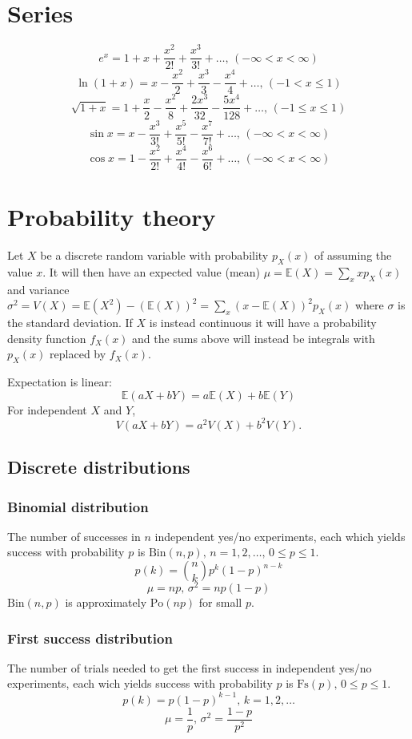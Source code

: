 \documentclass[a4paper]{article}
\begin{document}
\begin{landscape}
\begin{multicols}{2}
\section{Series} 
$$e^x = 1+x+\frac{x^2}{2!}+\frac{x^3}{3!}+\dots,\,(-\infty<x<\infty)$$
$$\ln(1+x) = x-\frac{x^2}{2}+\frac{x^3}{3}-\frac{x^4}{4}+\dots,\,(-1<x\leq1)$$
$$\sqrt{1+x} = 1+\frac{x}{2}-\frac{x^2}{8}+\frac{2x^3}{32}-\frac{5x^4}{128}+\dots,\,(-1\leq x\leq1)$$
$$\sin x = x-\frac{x^3}{3!}+\frac{x^5}{5!}-\frac{x^7}{7!}+\dots,\,(-\infty<x<\infty)$$
$$\cos x = 1-\frac{x^2}{2!}+\frac{x^4}{4!}-\frac{x^6}{6!}+\dots,\,(-\infty<x<\infty)$$

\section{Probability theory}
Let $X$ be a discrete random variable with probability $p_X(x)$ of assuming the value $x$. It will then have an expected value (mean) $\mu=\mathbb{E}(X)=\sum_xxp_X(x)$ and variance $\sigma^2=V(X)=\mathbb{E}(X^2)-(\mathbb{E}(X))^2=\sum_x(x-\mathbb{E}(X))^2p_X(x)$ where $\sigma$ is the standard deviation. If $X$ is instead continuous it will have a probability density function $f_X(x)$ and the sums above will instead be integrals with $p_X(x)$ replaced by $f_X(x)$.

Expectation is linear:
\[\mathbb{E}(aX+bY) = a\mathbb{E}(X)+b\mathbb{E}(Y)\]
For independent $X$ and $Y$, \[V(aX+bY) = a^2V(X)+b^2V(Y).\]

\subsection{Discrete distributions}

\subsubsection{Binomial distribution}
The number of successes in $n$ independent yes/no experiments, each which yields success with probability $p$ is $\textrm{Bin}(n,p),\,n=1,2,\dots,\, 0\leq p\leq1$.
\[p(k)=\binom{n}{k}p^k(1-p)^{n-k}\]
\[\mu = np,\,\sigma^2=np(1-p)\]
$\textrm{Bin}(n,p)$ is approximately $\textrm{Po}(np)$ for small $p$.

\subsubsection{First success distribution}
The number of trials needed to get the first success in independent yes/no experiments, each wich yields success with probability $p$ is $\textrm{Fs}(p),\,0\leq p\leq1$.
\[p(k)=p(1-p)^{k-1},\,k=1,2,\dots\]
\[\mu = \frac1p,\,\sigma^2=\frac{1-p}{p^2}\]


\end{multicols}
\end{landscape}
\end{document}
